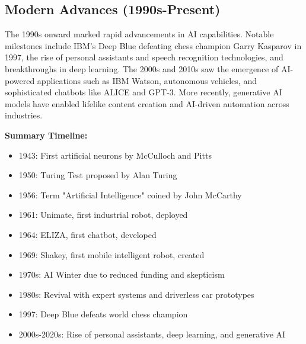 \subsection*{Modern Advances (1990s-Present)}
The 1990s onward marked rapid advancements in AI capabilities. Notable
milestones include IBM's Deep Blue defeating chess champion Garry Kasparov in
1997, the rise of personal assistants and speech recognition technologies, and
breakthroughs in deep learning. The 2000s and 2010s saw the emergence of
AI-powered applications such as IBM Watson, autonomous vehicles, and
sophisticated chatbots like ALICE and GPT-3. More recently, generative AI models
have enabled lifelike content creation and AI-driven automation across
industries.

\bigskip
\textbf{Summary Timeline:}

\begin{itemize}
    \item 1943: First artificial neurons by McCulloch and Pitts
    \item 1950: Turing Test proposed by Alan Turing
    \item 1956: Term "Artificial Intelligence" coined by John McCarthy
    \item 1961: Unimate, first industrial robot, deployed
    \item 1964: ELIZA, first chatbot, developed
    \item 1969: Shakey, first mobile intelligent robot, created
    \item 1970s: AI Winter due to reduced funding and skepticism
    \item 1980s: Revival with expert systems and driverless car prototypes
    \item 1997: Deep Blue defeats world chess champion
    \item 2000s-2020s: Rise of personal assistants, deep learning, and generative AI
\end{itemize}

